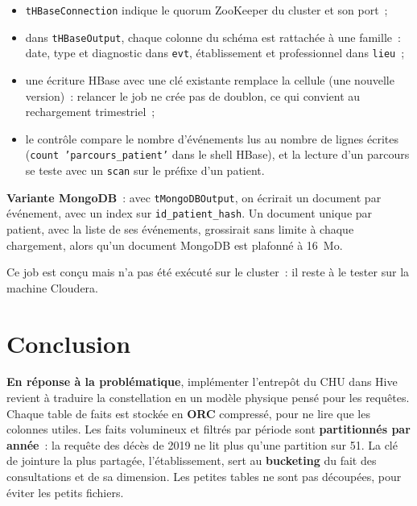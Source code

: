 \begin{itemize}
	\item \texttt{tHBaseConnection} indique le quorum ZooKeeper du cluster et son port~;
	\item dans \texttt{tHBaseOutput}, chaque colonne du schéma est rattachée à une famille~: date, type et diagnostic dans \texttt{evt}, établissement et professionnel dans \texttt{lieu}~;
	\item une écriture HBase avec une clé existante remplace la cellule (une nouvelle version)~: relancer le job ne crée pas de doublon, ce qui convient au rechargement trimestriel~;
	\item le contrôle compare le nombre d'événements lus au nombre de lignes écrites (\texttt{count 'parcours\_patient'} dans le shell HBase), et la lecture d'un parcours se teste avec un \texttt{scan} sur le préfixe d'un patient.
\end{itemize}

\noindent \textbf{Variante MongoDB}~: avec \texttt{tMongoDBOutput}, on écrirait un document par événement, avec un index sur \texttt{id\_patient\_hash}. Un document unique par patient, avec la liste de ses événements, grossirait sans limite à chaque chargement, alors qu'un document MongoDB est plafonné à 16~Mo.

\vspace{0.2cm}

\noindent Ce job est conçu mais n'a pas été exécuté sur le cluster~: il reste à le tester sur la machine Cloudera.

\newpage
\section*{Conclusion}
{}

\noindent \textbf{En réponse à la problématique}, implémenter l'entrepôt du CHU dans Hive revient à traduire la constellation en un modèle physique pensé pour les requêtes. Chaque table de faits est stockée en \textbf{ORC} compressé, pour ne lire que les colonnes utiles. Les faits volumineux et filtrés par période sont \textbf{partitionnés par année}~: la requête des décès de 2019 ne lit plus qu'une partition sur 51. La clé de jointure la plus partagée, l'établissement, sert au \textbf{bucketing} du fait des consultations et de sa dimension. Les petites tables ne sont pas découpées, pour éviter les petits fichiers.

\vspace{0.2cm}

